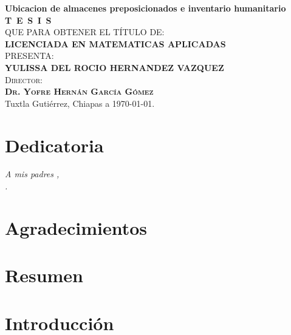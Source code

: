 \documentclass[
  spanish,
  us-letterpaper,
  DIV=11,
  numbers=noendperiod]{scrreprt}
\numberwithin{equation}{section}
\renewcommand*\contentsname{Tabla de contenidos}
\newcommand\contentsname{Tabla de contenidos}
\begin{document}
\begin{titlepage}
\begin{minipage}[t][0.95\textheight][c]{0.76\textwidth}
            \begin{center}
                {\Large\bfseries Ubicacion de almacenes preposicionados e inventario humanitario}\\[2cm]
                \textsc{\huge \textbf{T\, E\, S\, I\, S}}\\[1.5cm]
                \textsc{\large QUE PARA OBTENER EL TÍTULO DE:}\\[0.3cm]
                \textbf{\textsc{LICENCIADA EN MATEMATICAS APLICADAS}}\\[1.5cm]
                \textsc{\large PRESENTA:}\\[0.3cm]
                \textbf{\textsc{\large {YULISSA DEL ROCIO HERNANDEZ VAZQUEZ}}}\\[2cm]
                {\large\scshape Director:\\[0.3cm]
                {\textbf{\large Dr. Yofre Hernán García Gómez }}}\\[2.0cm]
                \large{Tuxtla Gutiérrez, Chiapas a \today.}

            \end{center}
\end{minipage}
\end{titlepage}

\pagebreak[2]

\chapter*{Dedicatoria}
\begin{flushright}
\textit{A mis padres , \\.}
\end{flushright}


\chapter*{Agradecimientos}

\renewcommand*\contentsname{Tabla de contenidos}
{
\hypersetup{linkcolor=}
\setcounter{tocdepth}{2}
\tableofcontents
}


\chapter{Resumen}\label{resumen}


\chapter{Introducción}\label{introducciuxf3n}
\end{document}
